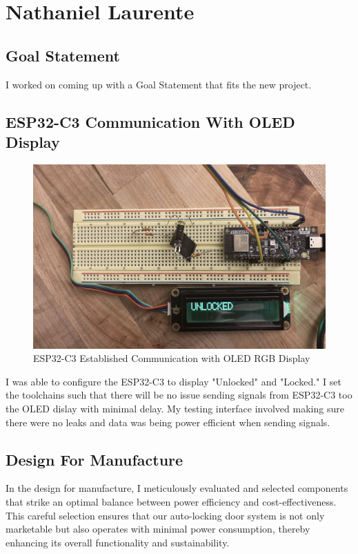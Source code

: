 \section{Nathaniel Laurente}

\subsection{Goal Statement}
    I worked on coming up with a Goal Statement that fits the new project.

\subsection{ESP32-C3 Communication With OLED Display}


\begin{figure}[!ht]
    \centering
    \includegraphics[width=140mm,scale=0.5]{./img/disp.png}
    \caption{ESP32-C3 Established Communication with OLED RGB Display}
    \label{fig:enter-label}
\end{figure}

    I was able to configure the ESP32-C3 to display "Unlocked" and "Locked." I set the toolchains such that there will be no issue sending signals from ESP32-C3 too the OLED dislay with minimal delay. My testing interface involved making sure there were no leaks and data was being power efficient when sending signals.

\subsection{Design For Manufacture}
    In the design for manufacture, I meticulously evaluated and selected components that strike an optimal balance between power efficiency and cost-effectiveness. This careful selection ensures that our auto-locking door system is not only marketable but also operates with minimal power consumption, thereby enhancing its overall functionality and sustainability.

